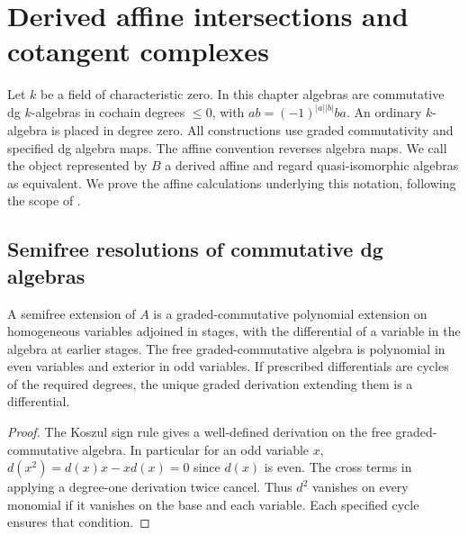 \chapter{Derived affine intersections and cotangent complexes}
\label{ch:derived-affines}

Let \(k\) be a field of characteristic zero. In this chapter algebras
are commutative dg \(k\)-algebras in cochain degrees \(\leq0\),
with \(ab=(-1)^{|a||b|}ba\). An ordinary \(k\)-algebra is placed
in degree zero. All constructions use graded commutativity and
specified dg algebra maps. The affine convention reverses algebra
maps. We call the object represented by \(B\) a derived affine and
regard quasi-isomorphic algebras as equivalent. We prove the affine
calculations underlying this notation, following the scope of
\cite[\S\S2.2 and 4.1]{toen}.

\section{Semifree resolutions of commutative dg algebras}

\begin{definition}\label{res:A01}
A semifree extension of \(A\) is a graded-commutative polynomial
extension on homogeneous variables adjoined in stages, with
the differential of a variable in the algebra at earlier stages.
The free graded-commutative algebra is polynomial in even variables
and exterior in odd variables. If prescribed differentials are
cycles of the required degrees, the unique graded derivation extending
them is a differential.
\end{definition}
\begin{proof}
The Koszul sign rule gives a well-defined derivation on the free
graded-commutative algebra. In particular for an odd variable \(x\),
\(d(x^2)=d(x)x-xd(x)=0\) since \(d(x)\) is even.
The cross terms in applying a degree-one derivation twice cancel.
Thus \(d^2\) vanishes on every monomial if it vanishes on the base
and each variable. Each specified cycle ensures that condition.
\end{proof}

